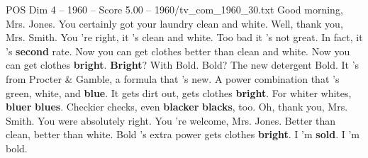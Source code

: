 \begin{textsample}{POS Dim 4 – 1960 – Score 5.00 – 1960/tv\_com\_1960\_30.txt}  \label{ex:f4_pos_001}
Good morning, Mrs.
Jones.
You certainly got your laundry clean and white.
Well, thank you, Mrs.
Smith.
You 're right, it 's clean and white.
Too bad it 's not great.
In fact, it 's \textbf{second} rate.
Now you can get clothes better than clean and white.
Now you can get clothes \textbf{bright}. \textbf{Bright}?
With Bold.
Bold?
The new detergent Bold.
It 's from Procter \& Gamble, a formula that 's new.
A power combination that 's green, white, and \textbf{blue}.
It gets dirt out, gets clothes \textbf{bright}.
For whiter whites, \textbf{bluer} \textbf{blues}.
Checkier checks, even \textbf{blacker} \textbf{blacks}, too.
Oh, thank you, Mrs.
Smith.
You were absolutely right.
You 're welcome, Mrs.
Jones.
Better than clean, better than white.
Bold 's extra power gets clothes \textbf{bright}.
I 'm \textbf{sold}.
I 'm bold.

\end{textsample}
